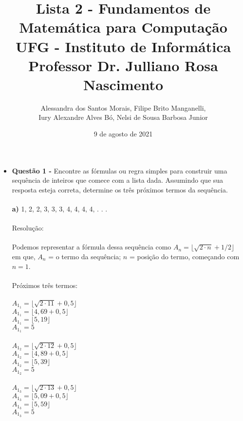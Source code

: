 \documentclass[a4paper,12pt]{article}
\begin{document}
\title{\textbf{Lista 2 - Fundamentos de Matemática para Computação} \\\vspace{5}\small UFG - Instituto de Informática\\\large Professor Dr. Julliano Rosa Nascimento}
\author{Alessandra dos Santos Morais, Filipe Brito Manganelli,\\Iury Alexandre Alves Bó, Nelsi de Sousa Barbosa Junior}
\date{9 de agosto de 2021}
\maketitle


\begin{itemize} %
    \item [] \textbf{Questão 1 -} Encontre as fórmulas ou regra simples para construir uma sequência de inteiros que comece com a lista dada. Assumindo que sua resposta esteja correta, determine os três próximos termos da sequência. %
    \
     \\\\\textbf{a)} 1, 2, 2, 3, 3, 3, 4, 4, 4, 4, . . . %
     \\\\Resolução:
     \\\\Podemos representar a fórmula dessa sequência como $A_n=\lfloor\sqrt{2\cdot n}+1/2\rfloor$
     \\em que, $A_n$ = o termo da sequência; $n$ = posição do termo, começando com $n=1$.
     \\\\Próximos três termos:
     \\\\$A_1_1=\lfloor\sqrt{2\cdot 11}+0,5\rfloor$
     \\$A_1_1=\lfloor4,69+0,5\rfloor$
     \\$A_1_1=\lfloor5,19\rfloor$
     \\$A_1_1=5$ 
    \\\\$A_1_2=\lfloor\sqrt{2\cdot 12}+0,5\rfloor$
     \\$A_1_2=\lfloor4,89+0,5\rfloor$
     \\$A_1_2=\lfloor5,39\rfloor$
     \\$A_1_2=5$ 
    \\\\$A_1_3=\lfloor\sqrt{2\cdot 13}+0,5\rfloor$
     \\$A_1_3=\lfloor5,09+0,5\rfloor$
     \\$A_1_3=\lfloor5,59\rfloor$
     \\$A_1_3=5$ 
     

\end{itemize}
\end{document}
